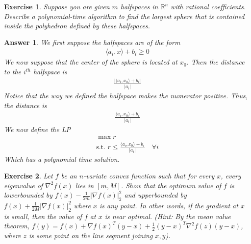 \documentclass[12pt]{article}
\theoremstyle{colon}
\newtheorem{exercise}{Exercise}
\newtheorem*{answer}{Answer}
\begin{document}
\clearpage

\begin{exercise}
  Suppose you are given $m$ halfspaces in $\mathbb{R}^n$ with rational coefficients. Describe a polynomial-time algorithm to find the largest \textit{sphere} that is contained inside the polyhedron defined by these halfspaces.
\end{exercise}

\begin{answer}
  We first suppose the halfspaces are of the form
  \begin{gather*}
    \langle a_i, x \rangle + b_i \geq 0
  \end{gather*}
  We now suppose that the center of the sphere is located at $x_0$. Then the distance to the $i^{th}$ halfspace is
  \begin{gather*}
    \frac{\lvert \langle a_i, x_0 \rangle + b_i \rvert}{\lvert a_i \rvert}
  \end{gather*}
  Notice that the way we defined the halfspace makes the numerator positive. Thus, the distance is
  \begin{gather*}
    \frac{\langle a_i, x_0 \rangle + b_i}{\lvert a_i \rvert}
  \end{gather*}
  We now define the LP
  \begin{gather*}
    \max r \\
    \text{s.t. } r \leq \frac{\langle a_i, x_0 \rangle + b_i}{\lvert a_i \rvert} \quad \forall i
  \end{gather*}
  Which has a polynomial time solution.
\end{answer}

\clearpage

\begin{exercise}
  Let $f$ be an $n$-variate convex function such that for every $x$, every eigenvalue of $\nabla^2 f(x)$ lies in $[m,M]$. Show that the optimum value of $f$ is lowerbounded by $f(x) - \frac{1}{2m} \lvert \nabla f(x) \rvert_2^2$ and upperbounded by $f(x) + \frac{1}{2M} \lvert \nabla f(x) \rvert_2^2$ where $x$ is any point. In other words, if the gradient at $x$ is small, then the value of $f$ at $x$ is near optimal. (Hint: By the mean value theorem, $f(y) = f(x) + \nabla f(x)^T (y - x) + \frac{1}{2}(y - x)^T \nabla^2 f(z) (y - x)$, where $z$ is some point on the line segment joining $x, y$).
\end{exercise}
\end{document}
